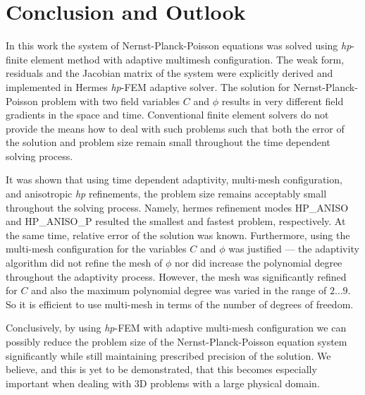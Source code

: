 \section{Conclusion and Outlook}\label{sec:conc}

In this work the system of Nernst-Planck-Poisson equations
was solved using \emph{hp}-finite element method with adaptive
multimesh configuration. The weak form, residuals and
the Jacobian matrix of the system were explicitly derived
and implemented in Hermes \emph{hp}-FEM adaptive solver.
The solution for Nernst-Planck-Poisson
problem with two field variables $C$ and $\phi$ results in 
very different field gradients in the space and time.
Conventional finite element solvers do not provide the means 
how to deal with such problems such that both the error of
the solution and problem size remain small throughout the
time dependent solving process.

It was shown that using time dependent adaptivity, multi-mesh
configuration, and anisotropic \emph{hp} refinements, the problem
size remains acceptably small throughout the solving process.
Namely, hermes refinement modes HP\_ANISO and HP\_ANISO\_P
resulted the smallest and fastest problem, respectively.
At the same time, relative error of the solution was known.
Furthermore, using the multi-mesh configuration for the variables
$C$ and $\phi$ was justified --- the adaptivity algorithm
did not refine the mesh of $\phi$ nor did increase the
polynomial degree throughout the adaptivity process. However,
the mesh was significantly refined for $C$ and also the
maximum polynomial degree was varied in the range of
$2\ldots 9$. So it is efficient to use multi-mesh in terms of
the number of degrees of freedom.

Conclusively, by using \emph{hp}-FEM with adaptive multi-mesh
configuration we can possibly reduce the problem size
of the Nernst-Planck-Poisson equation system significantly while
still maintaining prescribed precision of the solution. 
We believe, and this
is yet to be demonstrated, that this becomes especially
important when dealing with 3D problems with a large physical
domain.
